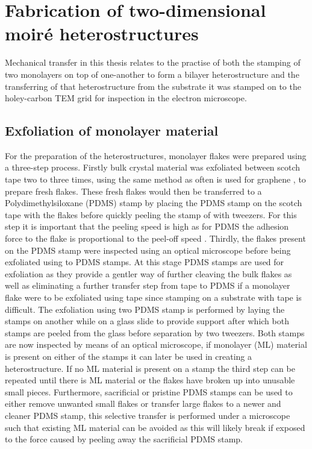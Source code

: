 \section{Fabrication of two-dimensional moiré heterostructures}
Mechanical transfer in this thesis relates to the practise of both the stamping of two monolayers on top of one-another to form a bilayer heterostructure and the transferring of that heterostructure from the substrate it was stamped on to the holey-carbon TEM grid for inspection in the electron microscope.

\subsection{Exfoliation of monolayer material}
For the preparation of the heterostructures, monolayer flakes were prepared using a three-step process.
Firstly bulk crystal material was exfoliated between scotch tape two to three times, using the same method as often is used for graphene \cite{novoselovRoomTemperatureQuantumHall2007}, to prepare fresh flakes.
These fresh flakes would then be transferred to a Polydimethylsiloxane (PDMS) stamp by placing the PDMS stamp on the scotch tape with the flakes before quickly peeling the stamp of with tweezers. For this step it is important that the peeling speed is high as for PDMS the adhesion force to the flake is proportional to the peel-off speed \cite{kusakaMicrocontactPatterningConductive2015}.
Thirdly, the flakes present on the PDMS stamp were inspected using an optical microscope before being exfoliated using to PDMS stamps. At this stage PDMS stamps are used for exfoliation as they provide a gentler way of further cleaving the bulk flakes as well as eliminating a further transfer step from tape to PDMS if a monolayer flake were to be exfoliated using tape since stamping on a substrate with tape is difficult. The exfoliation using two PDMS stamp is performed by laying the stamps on another while on a glass slide to provide support after which both stamps are peeled from the glass before separation by two tweezers. Both stamps are now inspected by means of an optical microscope, if monolayer (ML) material is present on either of the stamps it can later be used in creating a heterostructure.
If no ML material is present on a stamp the third step can be repeated until there is ML material or the flakes have broken up into unusable small pieces.
Furthermore, sacrificial or pristine PDMS stamps can be used to either remove unwanted small flakes or transfer large flakes to a newer and cleaner PDMS stamp, this selective transfer is performed under a microscope such that existing ML material can be avoided as this will likely break if exposed to the force caused by peeling away the sacrificial PDMS stamp.

